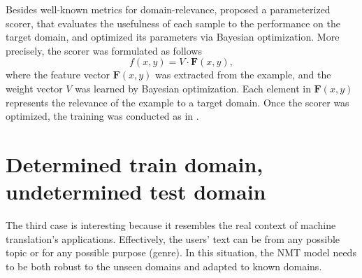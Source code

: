 Besides well-known metrics for domain-relevance, \citet{Zhang19curriculum} proposed a parameterized scorer, that evaluates the usefulness of each sample to the performance on the target domain, and optimized its parameters via Bayesian optimization. More precisely, the scorer was formulated as follows
\begin{equation}
\mathit{f}(x,y) = V \cdot \mathbf{F}(x,y),
\end{equation}
where the feature vector $\mathbf{F}(x,y)$ was extracted from the example, and the weight vector $V$ was learned by Bayesian optimization. Each element in $\mathbf{F}(x,y)$ represents the relevance of the example to a target domain. Once the scorer was optimized, the training was conducted as in \citet{Wees17dynamic,Wang19dynamically}.

\section{Determined train domain, undetermined test domain}
\label{sec:case3}
The third case is interesting because it resembles the real context of machine translation's applications. Effectively, the users' text can be from any possible topic or for any possible purpose (genre). In this situation, the NMT model needs to be both robust to the unseen domains and adapted to known domains. 

